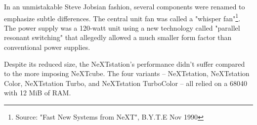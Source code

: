 \par
\vspace{-5pt}
In an unmistakable Steve Jobsian fashion, several components were renamed to emphasize subtle differences. The central unit fan was called a "whisper fan"\footnote{Source: "Fast New Systems from NeXT", B.Y.T.E Nov 1990}.  The power supply was a 120-watt unit using a new technology called "parallel resonant switching" that allegedly allowed a much smaller form factor than conventional power supplies.\\
\par
Despite its reduced size, the NeXTstation's performance didn't suffer compared to the more imposing NeXTcube. The four variants -- NeXTstation, NeXTstation Color, NeXTstation Turbo, and NeXTstation TurboColor -- all relied on a 68040 with 12 MiB of RAM.\\
\par
{}
\pagebreak









